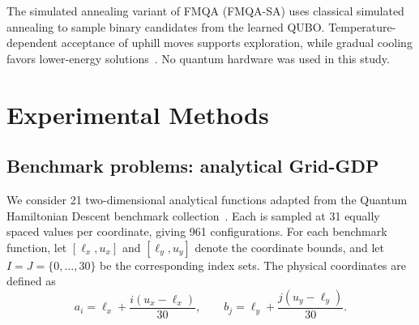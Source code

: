 \documentclass{article}
\begin{document}
The simulated annealing variant of FMQA (FMQA-SA) uses classical simulated annealing to sample binary candidates from the learned QUBO. 
Temperature-dependent acceptance of uphill moves supports exploration, while gradual cooling favors lower-energy solutions~\cite{kirkpatrick1983optimization}. 
No quantum hardware was used in this study.

\section{Experimental Methods}
\label{sec:methodology}\label{sec:cases}

\subsection{Benchmark problems: analytical Grid-GDP}
\label{sec:grid-gdp-formulation}
We consider 21 two-dimensional analytical functions adapted from the Quantum Hamiltonian Descent benchmark collection~\cite{qhdBenchmarks}. 
Each is sampled at 31 equally spaced values per coordinate, giving 961 configurations. 
For each benchmark function, let \([\ell_x,u_x]\) and \([\ell_y,u_y]\) denote the coordinate bounds, and let \(I=J=\{0,\ldots,30\}\) be the corresponding index sets.
The physical coordinates are defined as
\begin{equation}\label{eqn:grid-coordinates}
a_i=\ell_x+\frac{i(u_x-\ell_x)}{30},\qquad
b_j=\ell_y+\frac{j(u_y-\ell_y)}{30}.
\end{equation}
\end{document}
